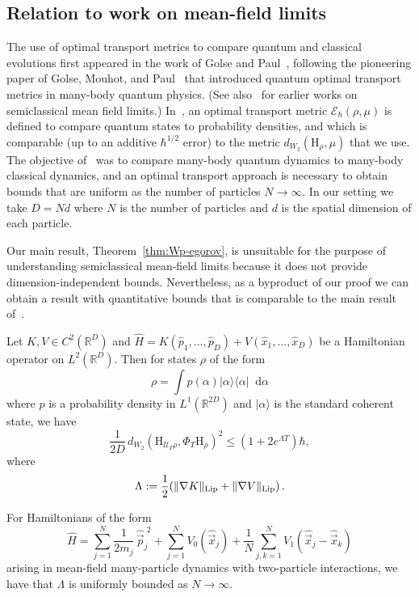 \documentclass[11pt]{amsart}
\def\Husimi{{\mathrm{H}}}
\def\Real{{\mathbb R}}
\newcommand{\diff}{\mathop{}\!\mathrm{d}}
\newcommand{\mcal}[1]{{\mathcal{#1}}}
\numberwithin{equation}{section}
\begin{document}
\subsection{Relation to work on mean-field limits}
The use of optimal transport metrics to compare quantum and classical evolutions first appeared in the work of Golse and Paul~\cite{GP2017}, following the pioneering paper of Golse, Mouhot, and Paul~\cite{GMP2016} that introduced quantum optimal transport metrics in many-body quantum physics. (See also~\cite{narnhofer1981vlasov,pezzotti2009mean,graffi2003mean} for earlier works on semiclassical mean field limits.)
In~\cite{GMP2016}, an optimal transport metric $\mcal{E}_\hbar(\rho,\mu)$ is defined to compare quantum states to probability densities, and which is comparable (up to an additive $\hbar^{1/2}$ error) to the metric $d_{W_2}(\Husimi_\rho,\mu)$ that we use.
The objective of~\cite{GP2017} was to compare many-body quantum dynamics to many-body classical dynamics, and an optimal transport approach is necessary to obtain bounds that are uniform as the number of particles $N\to \infty$.
In our setting we take $D=Nd$ where $N$ is the number of particles and $d$ is the spatial dimension of each particle.

Our main result, Theorem~\ref{thm:Wp-egorov}, is unsuitable for the purpose of understanding semiclassical
mean-field limits because it does not provide dimension-independent bounds.
Nevertheless, as a byproduct of our proof we can obtain a result with quantitative bounds that is
comparable to the main result of~\cite{GP2017}.
\begin{theorem}
\label{thm:mean-field}
Let $K,V\in C^{2}(\Real^D)$ and $\hat{H} = K(\hat{p}_1,...,\hat{p}_D) + V(\hat{x}_1,...,\hat{x}_D)$ be a Hamiltonian operator on $L^2(\Real^D)$.  Then
for states $\rho$ of the form
\[
\rho = \int p(\alpha) |\alpha \rangle \langle \alpha |\diff \alpha
\]
where $p$ is a probability density in $L^1(\Real^{2D})$ and $|\alpha\rangle$ is the standard coherent state, we have
\[
\frac{1}{2D} \, d_{W_2}(\Husimi_{\mcal{U}_T\rho}, \Phi_T\Husimi_\rho)^2 \leq (1+2e^{\Lambda T}) \hbar,
\]
where
\[
\Lambda := \frac12 (\|\nabla K\|_{\rm Lip} + \|\nabla V\|_{\rm Lip})\,.
\]
\end{theorem}
For Hamiltonians of the form
\[
\hat{H} = \sum_{j=1}^N \frac{1}{2m_j} \,\hat{\vec{p}}_j^{\,\,2} + \sum_{j=1}^N V_0(\hat{\vec{x}}_j) + \frac1N \sum_{j,k=1}^N V_1(\hat{\vec{x}}_j-\hat{\vec{x}}_k)
\]
arising in mean-field many-particle dynamics with two-particle interactions, we have that $\Lambda$ is uniformly
bounded as $N\to\infty$.
\end{document}
